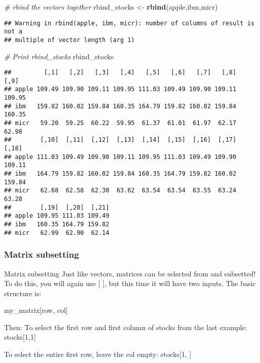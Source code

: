 \documentclass[]{article}
\newenvironment{Shaded}{\begin{snugshade}}{\end{snugshade}}
\newcommand{\KeywordTok}[1]{\textcolor[rgb]{0.13,0.29,0.53}{\textbf{#1}}}
\newcommand{\StringTok}[1]{\textcolor[rgb]{0.31,0.60,0.02}{#1}}
\newcommand{\CommentTok}[1]{\textcolor[rgb]{0.56,0.35,0.01}{\textit{#1}}}
\newcommand{\NormalTok}[1]{#1}
\begin{document}
\begin{Shaded}
\begin{Highlighting}[]
\CommentTok{# rbind the vectors together}
\NormalTok{rbind_stocks <-}\StringTok{ }\KeywordTok{rbind}\NormalTok{(apple,ibm,micr)}
\end{Highlighting}
\end{Shaded}

\begin{verbatim}
## Warning in rbind(apple, ibm, micr): number of columns of result is not a
## multiple of vector length (arg 1)
\end{verbatim}

\begin{Shaded}
\begin{Highlighting}[]
\CommentTok{# Print rbind_stocks}
\NormalTok{rbind_stocks}
\end{Highlighting}
\end{Shaded}

\begin{verbatim}
##         [,1]   [,2]   [,3]   [,4]   [,5]   [,6]   [,7]   [,8]   [,9]
## apple 109.49 109.90 109.11 109.95 111.03 109.49 109.90 109.11 109.95
## ibm   159.82 160.02 159.84 160.35 164.79 159.82 160.02 159.84 160.35
## micr   59.20  59.25  60.22  59.95  61.37  61.01  61.97  62.17  62.98
##        [,10]  [,11]  [,12]  [,13]  [,14]  [,15]  [,16]  [,17]  [,18]
## apple 111.03 109.49 109.90 109.11 109.95 111.03 109.49 109.90 109.11
## ibm   164.79 159.82 160.02 159.84 160.35 164.79 159.82 160.02 159.84
## micr   62.68  62.58  62.30  63.62  63.54  63.54  63.55  63.24  63.28
##        [,19]  [,20]  [,21]
## apple 109.95 111.03 109.49
## ibm   160.35 164.79 159.82
## micr   62.99  62.90  62.14
\end{verbatim}

\subsubsection{Matrix subsetting}\label{matrix-subsetting}

Matrix subsetting Just like vectors, matrices can be selected from and
subsetted! To do this, you will again use {[} {]}, but this time it will
have two inputs. The basic structure is:

my\_matrix{[}row, col{]}

Then: To select the first row and first column of stocks from the last
example: stocks{[}1,1{]}

To select the entire first row, leave the col empty: stocks{[}1, {]}
\end{document}
